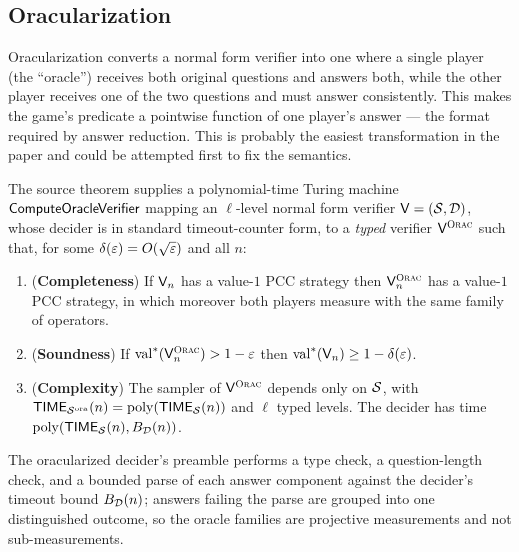 \subsection{Oracularization}
\label{sec:ps-oracularization}

Oracularization converts a normal form verifier into one where a single player (the
``oracle'') receives both original questions and answers both, while the other player
receives one of the two questions and must answer consistently. This makes the game's
predicate a pointwise function of one player's answer --- the format required by answer
reduction. This is probably the easiest transformation in the paper and could be attempted first to fix the semantics. 

\begin{theorem}[Oracularization]
\label{thm:oracularization}
\leanok
The source theorem supplies a polynomial-time Turing machine $\mathsf{ComputeOracleVerifier}$
mapping an $\ell$-level normal form verifier $\mathsf{V} = (\mathcal{S}, \mathcal{D})$,
whose decider is in standard timeout-counter form, to a \emph{typed} verifier $\mathsf{V}^{\textsc{Orac}}$
such that, for some $\delta(\varepsilon) = O(\sqrt{\varepsilon})$ and all $n$:
\begin{enumerate}
\item (\textbf{Completeness}) If $\mathsf{V}_n$ has a value-$1$ PCC strategy then
  $\mathsf{V}^{\textsc{Orac}}_n$ has a value-$1$ PCC strategy, in which moreover both players measure with the
  same family of operators.
\item (\textbf{Soundness}) If $\mathrm{val}^*(\mathsf{V}^{\textsc{Orac}}_n) > 1 - \varepsilon$ then
  $\mathrm{val}^*(\mathsf{V}_n) \geq 1 - \delta(\varepsilon)$.
\item (\textbf{Complexity}) The sampler of $\mathsf{V}^{\textsc{Orac}}$ depends only on $\mathcal{S}$, with
  $\mathsf{TIME}_{\mathcal{S}^{\mathrm{ora}}}(n) = \mathrm{poly}(\mathsf{TIME}_{\mathcal{S}}(n))$ and $\ell$ typed levels.
  The decider has time $\mathrm{poly}(\mathsf{TIME}_{\mathcal{S}}(n),B_{\mathcal{D}}(n))$.
\end{enumerate}
The oracularized decider's preamble performs a type check, a question-length check, and a
bounded parse of each answer component against the decider's timeout bound $B_{\mathcal{D}}(n)$;
answers failing the parse are grouped into one distinguished outcome, so the oracle
families are projective measurements and not sub-measurements.
\end{theorem}
